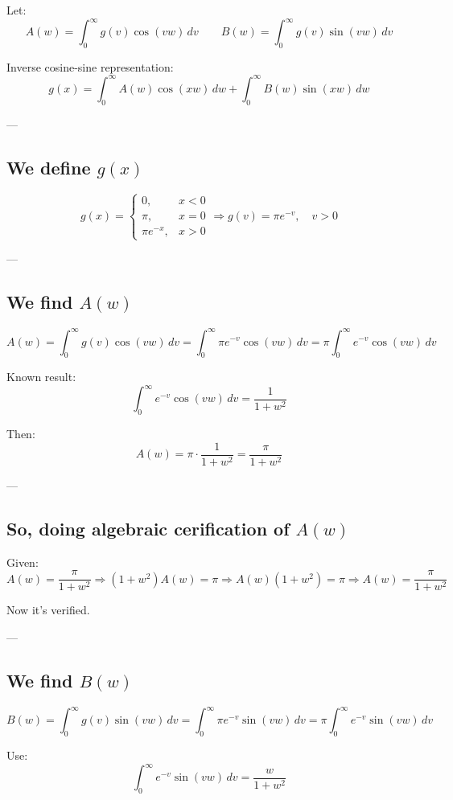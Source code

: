 \documentclass{article}
\begin{document}
Let:
\[
A(w) = \int_0^\infty g(v) \cos(vw) \, dv
\qquad
B(w) = \int_0^\infty g(v) \sin(vw) \, dv
\]

Inverse cosine-sine representation:
\[
g(x) = \int_0^\infty A(w) \cos(xw) \, dw + \int_0^\infty B(w) \sin(xw) \, dw
\]

---

\subsection*{We define \( g(x) \)}

\[
g(x) =
\begin{cases}
0, & x < 0 \\
\pi, & x = 0 \\
\pi e^{-x}, & x > 0
\end{cases}
\Rightarrow g(v) = \pi e^{-v}, \quad v > 0
\]

---

\subsection*{We find \( A(w) \)}

\[
A(w) = \int_0^\infty g(v) \cos(vw) \, dv
= \int_0^\infty \pi e^{-v} \cos(vw) \, dv
= \pi \int_0^\infty e^{-v} \cos(vw) \, dv
\]

Known result:
\[
\int_0^\infty e^{-v} \cos(vw) \, dv = \frac{1}{1 + w^2}
\]

Then:
\[
A(w) = \pi \cdot \frac{1}{1 + w^2}
= \frac{\pi}{1 + w^2}
\]

---

\subsection*{So, doing algebraic cerification of \( A(w) \)}

Given:
\[
A(w) = \frac{\pi}{1 + w^2}
\Rightarrow (1 + w^2)A(w) = \pi
\Rightarrow A(w)(1 + w^2) = \pi
\Rightarrow A(w) = \frac{\pi}{1 + w^2}
\]

Now it's verified.

---

\subsection*{We find \( B(w) \)}

\[
B(w) = \int_0^\infty g(v) \sin(vw) \, dv = \int_0^\infty \pi e^{-v} \sin(vw) \, dv = \pi \int_0^\infty e^{-v} \sin(vw) \, dv
\]

Use:
\[
\int_0^\infty e^{-v} \sin(vw) \, dv = \frac{w}{1 + w^2}
\]
\end{document}
